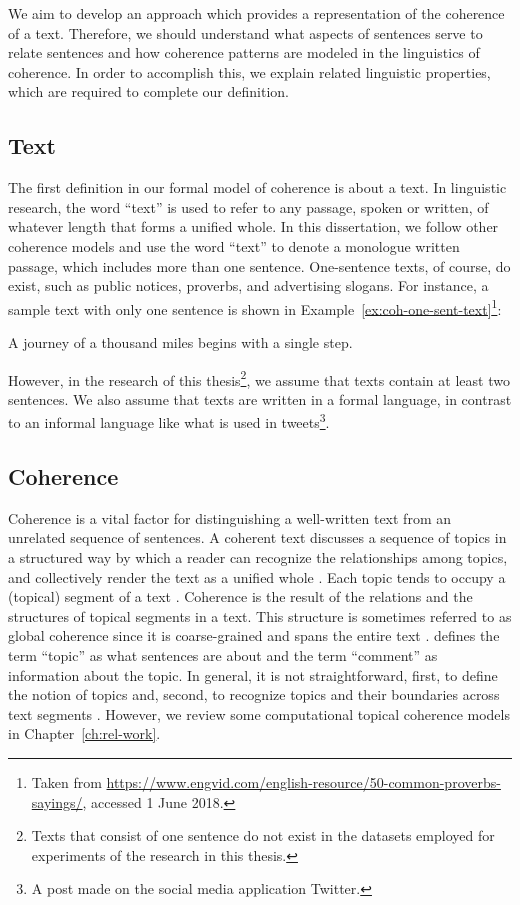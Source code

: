 We aim to develop an approach which provides a representation of the coherence of a text. 
Therefore, we should understand what aspects of sentences serve to relate sentences and how coherence patterns are modeled in the linguistics of coherence. 
In order to accomplish this, we explain related linguistic properties, which are required to complete our definition. 


\subsection{Text}

The first definition in our formal model of coherence is about a text. 
In linguistic research, the word ``text'' is used to refer to any passage, spoken or written, of whatever length that forms a unified whole.  
In this dissertation, we follow other coherence models \cite{barzilay08,guinaudeau13} and use the word ``text'' to denote a  monologue written passage, which includes more than one sentence.
One-sentence texts, of course, do exist, such as public notices, proverbs, and advertising slogans.  
For instance, a sample text with only one sentence is shown in Example~\ref{ex:coh-one-sent-text}\footnote{Taken from \url{https://www.engvid.com/english-resource/50-common-proverbs-sayings/}, accessed 1 June 2018.}: 

\begin{examples}
    \label{ex:coh-one-sent-text}
    A journey of a thousand miles begins with a single step.
\end{examples}

However, in the research of this thesis\footnote{Texts that consist of one sentence do not exist in the datasets employed for experiments of the research in this thesis.}, we assume that texts contain at least two sentences. 
We also assume that texts are written in a formal language, in contrast to an informal language like what is used in tweets\footnote{A post made on the social media application Twitter.}. 

\subsection{Coherence}

Coherence is a vital factor for distinguishing a well-written text from an unrelated sequence of sentences. 
A coherent text discusses a sequence of topics in a structured way by which a reader can recognize the relationships among topics, and collectively render the text as a unified whole \cite{stede12}. 
Each topic tends to occupy a (topical) segment of a text \cite{hearst97}. 
Coherence is the result of the relations and the structures of topical segments in a text. 
This structure is sometimes referred to as global coherence since it is coarse-grained and spans the entire text \cite{elsner07}. 
 defines the term ``topic'' as what sentences are about and the term ``comment'' as information about the topic.  
In general, it is not straightforward, first, to define the notion of topics and, second, to recognize topics and their boundaries across text segments \cite{stede12}.
However, we review some computational topical coherence models in Chapter~\ref{ch:rel-work}. 

